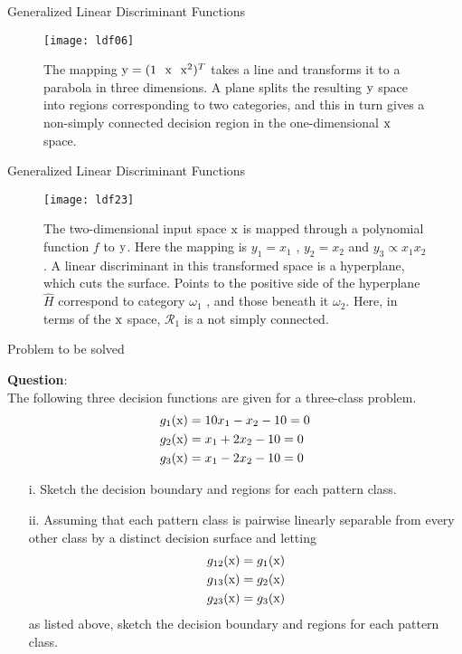 \begin{frame}{Generalized Linear Discriminant Functions}
\begin{figure}
\texttt{[image: ldf06]}
\caption{The mapping ${\rm y} = (1~~ {\rm x}~~ {\rm x}^2 )^T$ takes a line and transforms it to a parabola
in three dimensions. A plane splits the resulting ${\rm y}$ space into regions corresponding
to two categories, and this in turn gives a non-simply connected decision region in the
one-dimensional ${\rm x}$ space.}
\end{figure}
\end{frame}

\begin{frame}{Generalized Linear Discriminant Functions}
\begin{figure}
\texttt{[image: ldf23]}
\caption{The two-dimensional input space ${\rm x}$ is mapped through a polynomial
function $f$ to ${\rm y}$. Here the mapping is ${ y}_1 = {x}_1$ , ${y}_2 = {x}_2$ and ${y}_3\propto {x}_1 {x}_2$ . A linear
discriminant in this transformed space is a hyperplane, which cuts the surface. Points to the positive side of the hyperplane $\hat{H}$ correspond to category $\omega_1$ , and those beneath
it $\omega_2$. Here, in terms of the ${\rm x}$ space, $\mathcal{R}_1$ is a not simply connected.}
\end{figure}
\end{frame}

\begin{frame}{Problem to be solved}
\begin{small}
\textbf{\color{mycolor2}Question}:\\
The following three decision functions are given for a three-class problem.
\begin{align*}
g_1({\rm x}) &= 10x_1 -x_2 -10 = 0\\
g_2 ({\rm x}) &= x_1 + 2x_2 - 10 = 0\\
g_3({\rm x}) &= x_1 -2x_2 -10 = 0
\end{align*}
\begin{itemize}
\item[i.] Sketch the decision boundary and regions for each pattern class.
\item[ii.] Assuming that each pattern class is pairwise linearly separable from every other class
by a distinct decision surface and letting
\begin{align*}
g_{12}({\rm x}) &= g_1({\rm x})\\
g_{13}({\rm x}) &= g_2({\rm x})\\
g_{23}({\rm x}) &= g_3({\rm x})
\end{align*}
as listed above, sketch the decision boundary and regions for each pattern class.
\end{itemize}
\end{small}
\end{frame}

